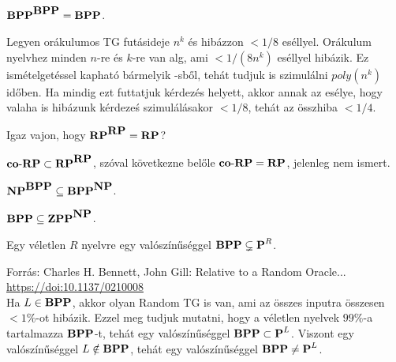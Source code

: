 \begin{Exercise}[counter={sorszam}, difficulty=1]
	$\mbox{\ensuremath{\mathbf{BPP}}}^{\mbox{\ensuremath{\mathbf{BPP}}}}=\mbox{\ensuremath{\mathbf{BPP}}}$.
\end{Exercise}	
\begin{Answer}
	Legyen or\'akulumos TG fut\'asideje $n^k$ \'es hib\'azzon $<1/8$ es\'ellyel.
	Or\'akulum nyelvhez minden $n$-re \'es $k$-re van \BPP alg, ami $<1/(8n^k)$ es\'ellyel hib\'azik.
	Ez ism\'etelget\'essel kaphat\'o b\'armelyik \BPP-sb\H ol, teh\'at tudjuk is szimul\'alni $poly(n^k)$ id\H oben.
	Ha mindig ezt futtatjuk k\'erdez\'es helyett, akkor annak az es\'elye, hogy valaha is hib\'azunk k\'erdeze\'s szimul\'al\'asakor $<1/8$, teh\'at az \"osszhiba $<1/4$.
\end{Answer}

\begin{Exercise}[counter={sorszam}, difficulty=0]
	Igaz vajon, hogy $\mbox{\ensuremath{\mathbf{RP}}}^{\mbox{\ensuremath{\mathbf{RP}}}}=\mbox{\ensuremath{\mathbf{RP}}}$?	
\end{Exercise}	
\begin{Answer}
	$\mbox{\ensuremath{\mathbf{co\text{-}RP}}}\subset \mbox{\ensuremath{\mathbf{RP}}}^{\mbox{\ensuremath{\mathbf{RP}}}}$, sz\'oval k\"ovetkezne bel\H ole $\mbox{\ensuremath{\mathbf{co\text{-}RP}}}=\mbox{\ensuremath{\mathbf{RP}}}$, jelenleg nem ismert.
\end{Answer}

\begin{Exercise}[counter={sorszam}, difficulty=1]
	$\mbox{\ensuremath{\mathbf{NP}}}^{\mbox{\ensuremath{\mathbf{BPP}}}} \subseteq \mbox{\ensuremath{\mathbf{BPP}}}^{\mbox{\ensuremath{\mathbf{NP}}}}$.
\end{Exercise}

\begin{Exercise}[counter={sorszam}, difficulty=0]
	$\mbox{\ensuremath{\mathbf{BPP}}} \subseteq \mbox{\ensuremath{\mathbf{ZPP}}}^{\mbox{\ensuremath{\mathbf{NP}}}}$.
	
\end{Exercise}

\begin{Exercise}[counter={sorszam}, difficulty=0]
	Egy v\'eletlen $R$ nyelvre egy val\'osz\'in\H us\'eggel $\mbox{\ensuremath{\mathbf{BPP}}}\subsetneq \mbox{\ensuremath{\mathbf{P}}}^R$.	
\end{Exercise}	
\begin{Answer}
	Forr\'as: Charles H. Bennett, John Gill: Relative to a Random Oracle... \url{https://doi:10.1137/0210008}\\
	Ha $L\in \mbox{\ensuremath{\mathbf{BPP}}}$, akkor olyan Random TG is van, ami az \"osszes inputra \"osszesen $<1\%$-ot hib\'azik. Ezzel meg tudjuk mutatni, hogy a v\'eletlen nyelvek $99\%$-a tartalmazza $\mbox{\ensuremath{\mathbf{BPP}}}$-t, teh\'at egy val\'osz\'in\H us\'eggel $\mbox{\ensuremath{\mathbf{BPP}}}\subset \mbox{\ensuremath{\mathbf{P}}}^L$. Viszont egy val\'osz\'in\H us\'eggel $L \notin \mbox{\ensuremath{\mathbf{BPP}}}$, teh\'at egy val\'osz\'in\H us\'eggel $\mbox{\ensuremath{\mathbf{BPP}}}\ne \mbox{\ensuremath{\mathbf{P}}}^L$.
\end{Answer}

